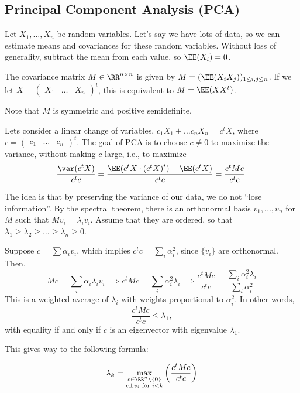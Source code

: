 \subsection{Principal Component Analysis (PCA)}

Let $X_1, \hdots, X_n$ be random variables. Let's say we have lots of data, so we can estimate means and covariances for these random variables. Without loss of generality, subtract the mean from each value, so $\EE(X_i)=0$. 

\begin{definition}

The \ac{covariance matrix} $M\in \RR^{n\times n}$ is given by $M = (\EE(X_iX_j))_{1\leq i,j\leq n}$. If we let $X = \begin{pmatrix}X_1 &\hdots &X_n\end{pmatrix}^t$, this is equivalent to $M = \EE(XX^t)$.
\end{definition}

Note that $M$ is symmetric and positive semidefinite. 

Lets consider a linear change of variables, $c_1X_1+\hdots c_nX_n=c^tX$, where $c = \begin{pmatrix}c_1 & \hdots &c_n\end{pmatrix}^t$. The goal of PCA is to choose $c\neq 0$ to maximize the variance, without making $c$ large, i.e., to maximize
\[\frac{\var (c^tX)}{c^tc} = \frac{\EE(c^tX\cdot (c^tX)^t) - \EE(c^tX)}{c^tc} = \frac{c^tMc}{c^tc}.\]

The idea is that by preserving the variance of our data, we do not ``lose information''. By the spectral theorem, there is an orthonormal basis $v_1, \hdots, v_n$ for $M$ such that $Mv_i = \lambda_iv_i$. Assume that they are ordered, so that $\lambda_1\geq \lambda_2\geq \hdots \geq \lambda_n\geq 0$.

Suppose $c = \sum \alpha_iv_i$, which implies $c^tc = \sum_i \alpha_i^2$, since $\{v_i\}$ are orthonormal. Then, 
\[Mc = \sum_i \alpha_i \lambda_i v_i \implies c^tMc = \sum_i \alpha_i^2\lambda_i \implies \frac{c^tMc}{c^tc} = \frac{\sum_i \alpha_i^2\lambda_i}{\sum_i \alpha_i^2}\]
This is a weighted average of $\lambda_i$ with weights proportional to $\alpha_i^2$. In other words,
\[\frac{c^tMc}{c^tc}\leq \lambda_1,\]
with equality if and only if $c$ is an eigenvector with eigenvalue $\lambda_1$. 

This gives way to the following formula: 
\begin{theorem}
\[\lambda_k = \max_{\substack{c\in \RR^n\setminus\{0\}\\ c\perp v_i\text{ for }i<k}} \left(\frac{c^tMc}{c^tc}\right)\]
\end{theorem}

